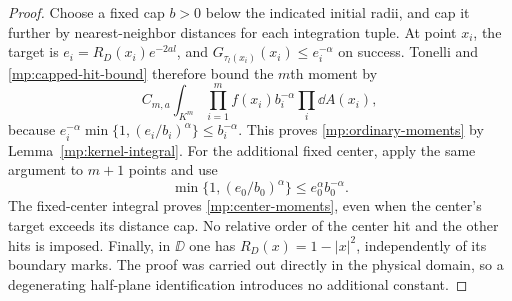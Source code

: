 \begin{proof}
Choose a fixed cap $b>0$ below the indicated initial radii, and cap
it further by nearest-neighbor distances for each integration tuple.
At point $x_i$, the target is $e_i=R_D(x_i)e^{-2al}$, and
$G_{\tau_l(x_i)}(x_i)\le e_i^{-\alpha}$ on success. Tonelli and
\eqref{mp:capped-hit-bound} therefore bound the $m$th moment by
\[
 C_{m,a}\int_{K^m}\prod_{i=1}^m f(x_i)b_i^{-\alpha}
                                                 \prod_i\dd A(x_i),
\]
because $e_i^{-\alpha}\min\{1,(e_i/b_i)^\alpha\}\le b_i^{-\alpha}$.
This proves \eqref{mp:ordinary-moments} by
Lemma~\ref{mp:kernel-integral}. For the additional fixed center, apply
the same argument to $m+1$ points and use
\[
 \min\{1,(e_0/b_0)^\alpha\}\le e_0^\alpha b_0^{-\alpha}.
\]
The fixed-center integral proves \eqref{mp:center-moments}, even
when the center's target exceeds its distance cap. No relative order
of the center hit and the other hits is imposed. Finally, in $\DD$
one has $R_D(x)=1-|x|^2$, independently of its boundary marks. The
proof was carried out directly in the physical domain, so a
degenerating half-plane identification introduces no additional
constant.
\end{proof}
